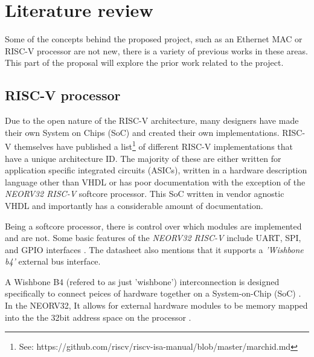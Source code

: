 
\chapter[Literature review]{Literature review }
\label{Chap:label}	%
\pagestyle{headings}



Some of the concepts behind the proposed project, such as an Ethernet MAC or RISC-V processor are not new, there is a variety of previous works in these areas. This part of the proposal will explore the prior work related to the project. 



\section{RISC-V processor}
Due to the open nature of the RISC-V architecture, many designers have made their own System on Chips (SoC) and created their own implementations. RISC-V 
themselves have published a list\footnote[1]{See: https://github.com/riscv/riscv-isa-manual/blob/master/marchid.md} of different RISC-V implementations 
that have a unique architecture ID. The majority of these are either written for application specific integrated circuits (ASICs), written in a hardware 
description language other than VHDL or has poor documentation with the exception of the  \textit{NEORV32 RISC-V} softcore processor. This SoC written 
in vendor agnostic VHDL and importantly has a considerable amount of documentation. 

Being a softcore processor, there is control over which modules are implemented and are not. Some basic features of the \textit{NEORV32 RISC-V} include 
UART, SPI, and GPIO interfaces \cite{neorv32Datasheet}. The datasheet \cite{neorv32Datasheet} also mentions that it supports a \textit{'Wishbone b4'} 
external bus interface. 


A Wishbone B4 (refered to as just 'wishbone') interconnection is designed specifically to connect peices of hardware together on a System-on-Chip (SoC) \cite{WishboneSpec}. In the NEORV32, 
It allows for external hardware modules to be memory mapped into the the 32bit address space on the processor \cite{neorv32Datasheet}.




